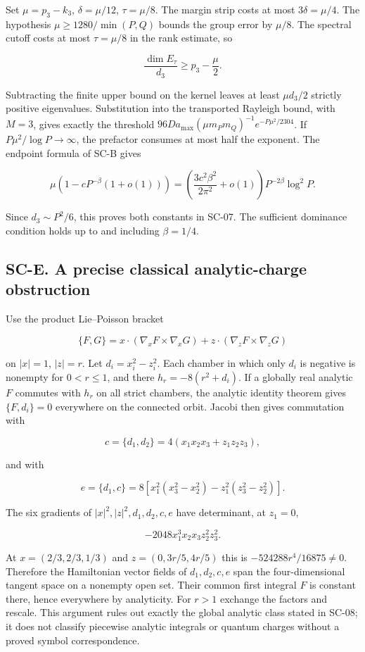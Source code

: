 \documentclass[a4paper,11pt]{article}
\numberwithin{equation}{section}
\begin{document}
Set \(\mu=p_3-k_3\), \(\delta=\mu/12\), \(\tau=\mu/8\). The margin strip costs at most \(3\delta=\mu/4\). The hypothesis \(\mu\geq1280/\min(P,Q)\) bounds the group error by \(\mu/8\). The spectral cutoff costs at most \(\tau=\mu/8\) in the rank estimate, so

\[
\frac{\dim E_\tau}{d_3}\geq p_3-\frac{\mu}{2}.
\]

Subtracting the finite upper bound on the kernel leaves at least \(\mu d_3/2\) strictly positive eigenvalues. Substitution into the transported Rayleigh bound, with \(M=3\), gives exactly the threshold \(96Da_{\max}(\mu m_Pm_Q)^{-1}e^{-P\mu^2/2304}\). If \(P\mu^2/\log P\to\infty\), the prefactor consumes at most half the exponent. The endpoint formula of SC-B gives

\[
\mu(1-cP^{-\beta}(1+o(1)))
=\left(\frac{3c^2\beta^2}{2\pi^2}+o(1)\right)
P^{-2\beta}\log^2P.
\]

Since \(d_3\sim P^2/6\), this proves both constants in SC-07. The sufficient dominance condition holds up to and including \(\beta=1/4\).

\hypertarget{sc-e.-a-precise-classical-analytic-charge-obstruction}{%
\subsection{SC-E. A precise classical analytic-charge obstruction}\label{sc-e.-a-precise-classical-analytic-charge-obstruction}}

Use the product Lie--Poisson bracket

\[
\{F,G\}=x\cdot(\nabla_xF\times\nabla_xG)
+z\cdot(\nabla_zF\times\nabla_zG)
\]

on \(|x|=1\), \(|z|=r\). Let \(d_i=x_i^2-z_i^2\). Each chamber in which only \(d_i\) is negative is nonempty for \(0<r\leq1\), and there \(h_r=-8(r^2+d_i)\). If a globally real analytic \(F\) commutes with \(h_r\) on all strict chambers, the analytic identity theorem gives \(\{F,d_i\}=0\) everywhere on the connected orbit. Jacobi then gives commutation with

\[
c=\{d_1,d_2\}=4(x_1x_2x_3+z_1z_2z_3),
\]

and with

\[
e=\{d_1,c\}
=8[x_1^2(x_3^2-x_2^2)-z_1^2(z_3^2-z_2^2)].
\]

The six gradients of \(|x|^2,|z|^2,d_1,d_2,c,e\) have determinant, at \(z_1=0\),

\[
-2048x_1^3x_2x_3z_2^2z_3^2.
\]

At \(x=(2/3,2/3,1/3)\) and \(z=(0,3r/5,4r/5)\) this is \(-524288r^4/16875\ne0\). Therefore the Hamiltonian vector fields of \(d_1,d_2,c,e\) span the four-dimensional tangent space on a nonempty open set. Their common first integral \(F\) is constant there, hence everywhere by analyticity. For \(r>1\) exchange the factors and rescale. This argument rules out exactly the global analytic class stated in SC-08; it does not classify piecewise analytic integrals or quantum charges without a proved symbol correspondence.
\end{document}

